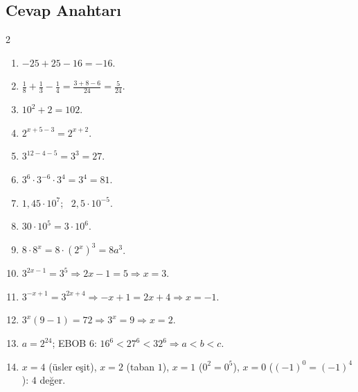 \subsection*{Cevap Anahtarı}
{\small
\begin{multicols}{2}
\begin{enumerate}[label=\textbf{\arabic*.},leftmargin=*,itemsep=1pt]
\item \(-25+25-16=-16\).
\item \(\frac18+\frac13-\frac14=\frac{3+8-6}{24}=\frac{5}{24}\).
\item \(10^2+2=102\).
\item \(2^{x+5-3}=2^{x+2}\).
\item \(3^{12-4-5}=3^3=27\).
\item \(3^{6}\cdot 3^{-6}\cdot 3^{4}=3^4=81\).
\item \(1{,}45\cdot 10^{7}\); \ \(2{,}5\cdot 10^{-5}\).
\item \(30\cdot 10^{5}=3\cdot 10^{6}\).
\item \(8\cdot 8^x=8\cdot(2^x)^3=8a^3\).
\item \(3^{2x-1}=3^5\Rightarrow 2x-1=5\Rightarrow x=3\).
\item \(3^{-x+1}=3^{2x+4}\Rightarrow -x+1=2x+4\Rightarrow x=-1\).
\item \(3^x(9-1)=72\Rightarrow 3^x=9\Rightarrow x=2\).
\item \(a=2^{24}\); EBOB \(6\): \(16^6<27^6<32^6\Rightarrow a<b<c\).
\item \(x=4\) (üsler eşit), \(x=2\) (taban \(1\)), \(x=1\) (\(0^2=0^5\)), \(x=0\) (\((-1)^0=(-1)^4\)): \(4\) değer.
\end{enumerate}
\end{multicols}}
